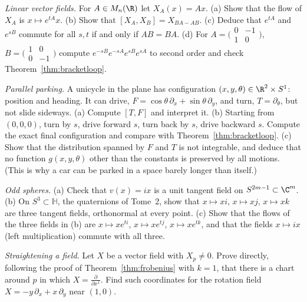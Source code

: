 \begin{exercise}[$\star$]\label{ex:linearfields}
\emph{Linear vector fields.} For $A\in M_n(\R)$ let $X_A(x)=Ax$. (a) Show that the flow of $X_A$ is $x\mapsto e^{tA}x$. (b) Show that $[X_A,X_B]=X_{BA-AB}$.
(c) Deduce that $e^{tA}$ and $e^{sB}$ commute for all $s,t$ if and only if $AB=BA$. (d) For $A=\bigl(\begin{smallmatrix}0&-1\\1&0\end{smallmatrix}\bigr)$, $B=\bigl(\begin{smallmatrix}1&0\\0&-1\end{smallmatrix}\bigr)$ compute
$e^{-sB}e^{-sA}e^{sB}e^{sA}$ to second order and check Theorem~\ref{thm:bracketloop}.
\end{exercise}

\begin{exercise}[$\star\star$]\label{ex:parking}
\emph{Parallel parking.} A unicycle in the plane has configuration $(x,y,\theta)\in\R^2\times S^1$: position and heading. It can drive,
$F=\cos\theta\,\partial_x+\sin\theta\,\partial_y$, and turn, $T=\partial_\theta$, but not slide sideways. (a) Compute $[T,F]$ and interpret it. (b) Starting
from $(0,0,0)$, turn by $s$, drive forward $s$, turn back by $s$, drive backward $s$. Compute the exact final configuration and compare with
Theorem~\ref{thm:bracketloop}. (c) Show that the distribution spanned by $F$ and $T$ is not integrable, and deduce that no function $g(x,y,\theta)$ other than
the constants is preserved by all motions. (This is why a car can be parked in a space barely longer than itself.)
\end{exercise}

\begin{exercise}[$\star$]\label{ex:hairyodd}
\emph{Odd spheres.} (a) Check that $v(x)=ix$ is a unit tangent field on $S^{2m-1}\subset\C^m$. (b) On $S^3\subset\mathbb{H}$, the quaternions of Tome~2, show that
$x\mapsto xi$, $x\mapsto xj$, $x\mapsto xk$ are three tangent fields, orthonormal at every point. (c) Show that the flows of the three fields in (b) are
$x\mapsto xe^{ti}$, $x\mapsto xe^{tj}$, $x\mapsto xe^{tk}$, and that the fields $x\mapsto ix$ (left multiplication) commute with all three.
\end{exercise}

\begin{exercise}[$\star\star$]\label{ex:straighten}
\emph{Straightening a field.} Let $X$ be a vector field with $X_p\ne0$. Prove directly, following the proof of Theorem~\ref{thm:frobenius} with $k=1$, that
there is a chart around $p$ in which $X=\frac\partial{\partial x^1}$. Find such coordinates for the rotation field $X=-y\,\partial_x+x\,\partial_y$ near $(1,0)$.
\end{exercise}

